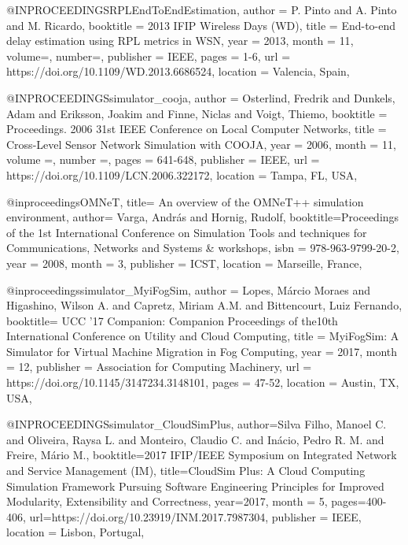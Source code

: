 \documentclass[english,version-2019-11]{uzl-thesis}
\begin{document}
\begin{bibtex-entries}
@INPROCEEDINGS{RPLEndToEndEstimation,
    author =    {P. Pinto and A. Pinto and M. Ricardo},
    booktitle = {2013 IFIP Wireless Days (WD)}, 
    title =     {End-to-end delay estimation using RPL metrics in WSN}, 
    year =      {2013},
    month =     {11},
    volume={},
    number={},
    publisher     = {IEEE},
    pages =     {1-6},
    url =       {https://doi.org/10.1109/WD.2013.6686524},
    location =  {Valencia, Spain},
}

@INPROCEEDINGS{simulator_cooja,
  author =      {Osterlind, Fredrik and Dunkels, Adam and Eriksson, Joakim and Finne, Niclas and Voigt, Thiemo},
  booktitle =   {Proceedings. 2006 31st IEEE Conference on Local Computer Networks}, 
  title =       {Cross-Level Sensor Network Simulation with COOJA}, 
  year =        {2006},
  month =       {11},
  volume ={},
  number ={},
  pages =       {641-648},
  publisher     = {IEEE},
  url =         {https://doi.org/10.1109/LCN.2006.322172},
  location =    {Tampa, FL, USA},
  }
  
@inproceedings{OMNeT,
  title=    {An overview of the OMNeT++ simulation environment},
  author=   {Varga, Andr{\'a}s and Hornig, Rudolf},
  booktitle={Proceedings of the 1st International Conference on Simulation Tools and techniques for Communications, Networks and Systems \& workshops},
  isbn =    {978-963-9799-20-2},
  year  =   {2008},
  month =       {3},
  publisher     = {ICST},
  location =    {Marseille, France},
}

@inproceedings{simulator_MyiFogSim,
    author = {Lopes, M\'{a}rcio Moraes and Higashino, Wilson A. and Capretz, Miriam A.M. and Bittencourt, Luiz Fernando},
    booktitle= {UCC '17 Companion: Companion Proceedings of the10th International Conference on Utility and Cloud Computing},
    title = {MyiFogSim: A Simulator for Virtual Machine Migration in Fog Computing},
    year = {2017},
    month = {12},
    publisher = {Association for Computing Machinery},
    url = {https://doi.org/10.1145/3147234.3148101},
    pages = {47-52},
    location = {Austin, TX, USA},
}


@INPROCEEDINGS{simulator_CloudSimPlus,
  author={Silva Filho, Manoel C. and Oliveira, Raysa L. and Monteiro, Claudio C. and In\'acio, Pedro R. M. and Freire, M\'ario M.},
  booktitle={2017 IFIP/IEEE Symposium on Integrated Network and Service Management (IM)}, 
  title={CloudSim Plus: A Cloud Computing Simulation
Framework Pursuing Software Engineering
Principles for Improved Modularity, Extensibility
and Correctness}, 
  year={2017},
  month = {5},
  pages={400-406},
  url={https://doi.org/10.23919/INM.2017.7987304},
  publisher = {IEEE},
  location = {Lisbon, Portugal},
}



\end{bibtex-entries}
\end{document}
